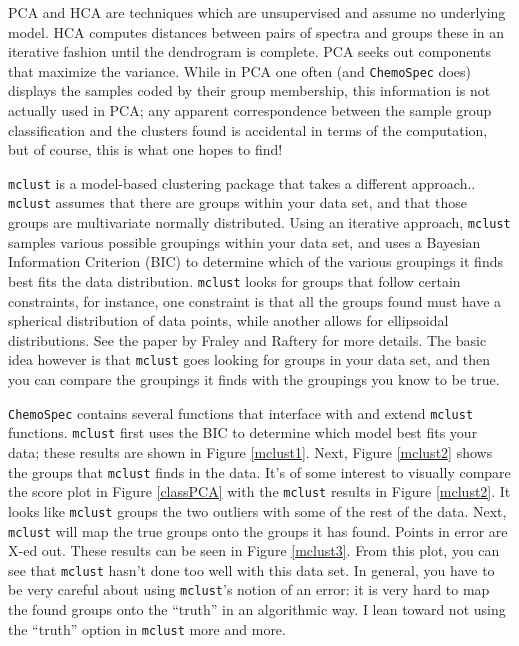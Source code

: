 \documentclass[letter,10pt,twocolumn,twoside,printwatermark=false]{pinp}
\begin{document}
PCA and HCA are techniques which are unsupervised and assume no
underlying model. HCA computes distances between pairs of spectra and
groups these in an iterative fashion until the dendrogram is complete.
PCA seeks out components that maximize the variance. While in PCA one
often (and \texttt{ChemoSpec} does) displays the samples coded by their
group membership, this information is not actually used in PCA; any
apparent correspondence between the sample group classification and the
clusters found is accidental in terms of the computation, but of course,
this is what one hopes to find!

\texttt{mclust} is a model-based clustering package that takes a
different approach.\citep{mclust-RJ}. \texttt{mclust} assumes that there
are groups within your data set, and that those groups are multivariate
normally distributed. Using an iterative approach, \texttt{mclust}
samples various possible groupings within your data set, and uses a
Bayesian Information Criterion (BIC) to determine which of the various
groupings it finds best fits the data distribution. \texttt{mclust}
looks for groups that follow certain constraints, for instance, one
constraint is that all the groups found must have a spherical
distribution of data points, while another allows for ellipsoidal
distributions. See the paper by Fraley and Raftery \citep{mclust-RJ} for
more details. The basic idea however is that \texttt{mclust} goes
looking for groups in your data set, and then you can compare the
groupings it finds with the groupings you know to be true.

\texttt{ChemoSpec} contains several functions that interface with and
extend \texttt{mclust} functions. \texttt{mclust} first uses the BIC to
determine which model best fits your data; these results are shown in
Figure \ref{mclust1}. Next, Figure \ref{mclust2} shows the groups that
\texttt{mclust} finds in the data. It's of some interest to visually
compare the score plot in Figure \ref{classPCA} with the \texttt{mclust}
results in Figure \ref{mclust2}. It looks like \texttt{mclust} groups
the two outliers with some of the rest of the data. Next,
\texttt{mclust} will map the true groups onto the groups it has found.
Points in error are X-ed out. These results can be seen in Figure
\ref{mclust3}. From this plot, you can see that \texttt{mclust} hasn't
done too well with this data set. In general, you have to be very
careful about using \texttt{mclust}'s notion of an error: it is very
hard to map the found groups onto the ``truth'' in an algorithmic way. I
lean toward not using the ``truth'' option in \texttt{mclust} more and
more.
\end{document}
